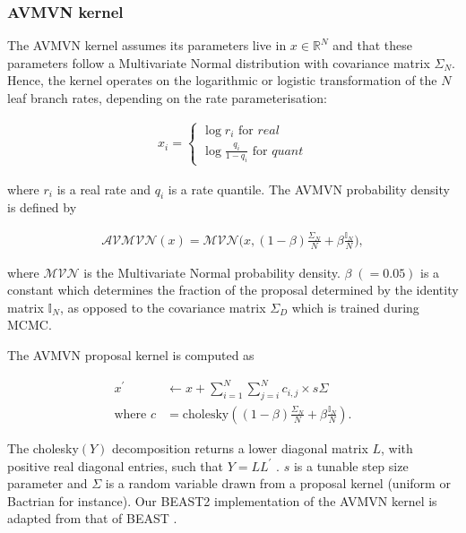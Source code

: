 \documentclass[10pt,letterpaper]{article}
\begin{document}
\subsubsection*{AVMVN kernel}


The AVMVN kernel assumes its parameters live in $x \in \mathbb{R}^N$ and that these parameters follow a Multivariate Normal distribution with covariance matrix $\Sigma_N$. Hence, the kernel operates on the logarithmic or logistic transformation of the $N$ leaf branch rates, depending on the rate parameterisation:

\begin{align}
	x_i = \begin{cases} \log r_i \text{ for } \textit{real} \\
						\log \frac{q_i}{1 - q_i} \text{ for } \textit{quant}  \end{cases}
\end{align}

where $r_i$ is a real rate and $q_i$ is a rate quantile. The AVMVN probability density is defined by 


\begin{align}
	\mathcal{AVMVN}(x) =  \mathcal{MVN}\big(x, (1-\beta) \frac{\Sigma_N}{N} + \beta \frac{\mathbb{I}_N}{N} \big) ,
\end{align}


where $\mathcal{MVN}$ is the Multivariate Normal probability density. $\beta \; (= 0.05)$ is a constant which determines the fraction of the proposal determined by the identity matrix $\mathbb{I}_N$, as opposed to the covariance matrix $\Sigma_D$ which is trained during MCMC.

The AVMVN proposal kernel is computed as


\begin{align}
	x^\prime &\leftarrow x + \sum\limits_{i=1}^N \sum\limits_{j=i}^N c_{i,j} \times s\Sigma \\
	\text {where }  c &= \text{cholesky} \left( (1-\beta) \frac{\Sigma_N}{N} + \beta \frac{\mathbb{I}_N}{N} \right).
\end{align}


The cholesky$(Y)$ decomposition returns a lower diagonal matrix $L$, with positive real diagonal entries, such that $Y = LL^\prime$ \cite{lindstrom1988newton, pourahmadi2007cholesky}. $s$ is a tunable step size parameter and $\Sigma$ is a random variable drawn from a proposal kernel (uniform or Bactrian for instance). Our BEAST2 implementation of the AVMVN kernel is adapted from that of BEAST \cite{suchard2018bayesian}.
\end{document}

